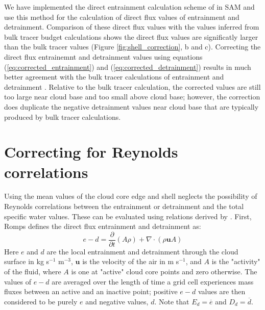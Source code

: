 \documentclass[draft,grl]{agutex}
\begin{document}
\begin{article}
We have implemented the direct entrainment calculation scheme of 
\cite{Romps2010} in SAM and use this method for the calculation of direct flux 
values of entrainment and detrainment.  Comparison of these direct flux values 
with the values inferred from bulk tracer budget calculations shows the 
direct flux values are significatly larger than the bulk tracer values 
(Figure \ref{fig:shell_correction}, b and c).  Correcting the direct flux 
entrainemnt and detrainment values using equations 
(\ref{eq:corrected_entrainment}) and (\ref{eq:corrected_detrainment}) results 
in much better agreement with the bulk tracer calculations of entrainment and 
detrainment .  Relative to the bulk tracer calculation, the corrected values 
are still too large near cloud base and too small above cloud base; however, 
the correction does duplicate the negative detrainment values near cloud base 
that are typically produced by bulk tracer calculations.


\section{Correcting for Reynolds correlations}

Using the mean values of the cloud core edge and shell neglects the possibility 
of Reynolds correlations between the entrainment or detrainment and the total 
specific water values.  These can be evaluated using relations derived by 
\cite{Romps2010}.  First, Romps defines the direct flux entrainment and 
detrainment as:
\begin{equation}
  \label{eq:romps_e_minus_d}
  e - d = \frac{\partial}{\partial t}(A\rho) 
        + \nabla \cdot (\rho \mathbf{u} A) 
\end{equation}
Here $e$ and $d$ are the local entrainment and detrainment through the cloud 
surface in kg s$^{-1}$ m$^{-3}$, $\mathbf{u}$ is the velocity of the air in 
m s$^{-1}$, and $A$ is the "activity" of the fluid, where $A$ is one at "active" 
cloud core points and zero otherwise.  The values of $e - d$ are averaged 
over the length of time a grid cell experiences mass fluxes between an active 
and an inactive point; positive $e-d$ values are then considered to be purely 
$e$ and negative values, $d$.  Note that $E_d = \overline{e}$ and 
$D_d = \overline{d}$.


\end{article}
\end{document}
